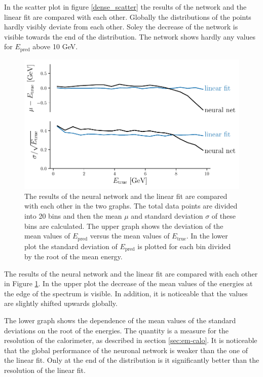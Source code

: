 \documentclass[12pt, a4paper]{thesis}
\begin{document}
In the scatter plot in figure \ref{dense_scatter} the results of the
network and the linear fit are compared with each other. Globally the
distributions of the points hardly visibly deviate from each
other. Soley the decrease of the network is visible towards the end of
the distribution.  The network shows hardly any values for
\(E_{\text{pred}}\) above 10 GeV.

\begin{figure}[hbtp]
  \centering
  \includegraphics[width=.9\linewidth]{../images/dense_res.pdf}
  \caption{ The results of the neural network and the linear fit are
    compared with each other in the two graphs. The total data points
    are divided into 20 bins and then the mean \(\mu\) and standard
    deviation \(\sigma\) of these bins are calculated. The upper graph
    shows the deviation of the mean values of \(E_{\text{pred}}\)
    versus the mean values of \(E_{\text{true}}\). In the lower plot
    the standard deviation of \(E_{\text{pred}}\) is plotted for each
    bin divided by the root of the mean energy. }
  \label{dense_res}
\end{figure} 

The results of the neural network and the linear fit are compared with
each other in Figure \ref{dense_res}. In the upper plot the decrease
of the mean values of the energies at the edge of the spectrum is
visible. In addition, it is noticeable that the values are slightly
shifted upwards globally.

The lower graph shows the dependence of the mean values of the
standard deviations on the root of the energies. The quantity is a
measure for the resolution of the calorimeter, as described in section
\ref{sec:em-calo}. It is noticeable that the global performance of the
neuronal network is weaker than the one of the linear fit. Only at the
end of the distribution is it significantly better than the resolution
of the linear fit.
\end{document}
